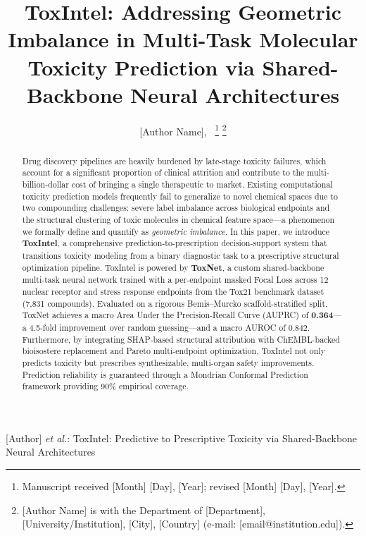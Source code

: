 \documentclass[lettersize,journal]{IEEEtran}
\begin{document}
\title{ToxIntel: Addressing Geometric Imbalance in Multi-Task Molecular Toxicity Prediction via Shared-Backbone Neural Architectures}

\author{[Author Name],~
\thanks{Manuscript received [Month] [Day], [Year]; revised [Month] [Day], [Year].}
\thanks{[Author Name] is with the Department of [Department], [University/Institution], [City], [Country] (e-mail: [email@institution.edu]).}}

%
{[Author] \MakeLowercase{\textit{et al.}}: ToxIntel: Predictive to Prescriptive Toxicity via Shared-Backbone Neural Architectures}

\maketitle

\begin{abstract}
Drug discovery pipelines are heavily burdened by late-stage toxicity failures,
which account for a significant proportion of clinical attrition and contribute
to the multi-billion-dollar cost of bringing a single therapeutic to market.
Existing computational toxicity prediction models frequently fail to generalize
to novel chemical spaces due to two compounding challenges: severe label
imbalance across biological endpoints and the structural clustering of toxic
molecules in chemical feature space---a phenomenon we formally define and
quantify as \textit{geometric imbalance}.
In this paper, we introduce \textbf{ToxIntel}, a comprehensive
prediction-to-prescription decision-support system that transitions toxicity
modeling from a binary diagnostic task to a prescriptive structural
optimization pipeline.
ToxIntel is powered by \textbf{ToxNet}, a custom shared-backbone multi-task
neural network trained with a per-endpoint masked Focal Loss across 12 nuclear
receptor and stress response endpoints from the Tox21 benchmark dataset
(7,831 compounds).
Evaluated on a rigorous Bemis--Murcko scaffold-stratified split, ToxNet
achieves a macro Area Under the Precision-Recall Curve (AUPRC) of
\textbf{0.364}---a 4.5-fold improvement over random guessing---and a macro
AUROC of 0.842.
Furthermore, by integrating SHAP-based structural attribution with
ChEMBL-backed bioisostere replacement and Pareto multi-endpoint optimization,
ToxIntel not only predicts toxicity but prescribes synthesizable,
multi-organ safety improvements.
Prediction reliability is guaranteed through a Mondrian Conformal Prediction
framework providing 90\% empirical coverage.
\end{abstract}
\end{document}
